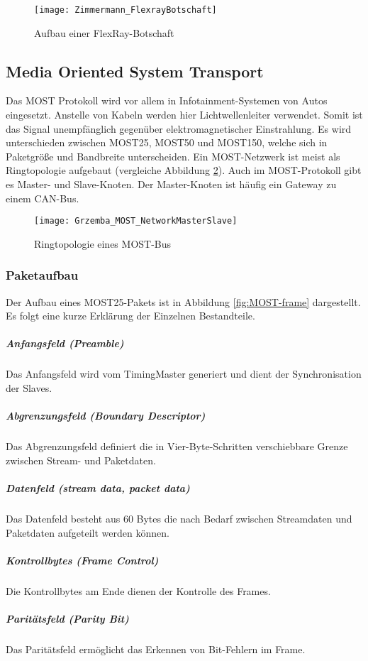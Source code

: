 \begin{figure}[H]
\centering
\texttt{[image: Zimmermann\_FlexrayBotschaft]}
\label{fig:FlexRayBotschaft}
\caption{Aufbau einer FlexRay-Botschaft}
\end{figure}


\subsection{Media Oriented System Transport}
Das \ac{MOST} Protokoll wird vor allem in Infotainment-Systemen von Autos eingesetzt. Anstelle von Kabeln werden hier Lichtwellenleiter verwendet. Somit ist das Signal unempfänglich gegenüber elektromagnetischer Einstrahlung. Es wird unterschieden zwischen \acs{MOST}25, \acs{MOST}50 und \acs{MOST}150, welche sich in Paketgröße und Bandbreite unterscheiden. Ein \acs{MOST}-Netzwerk ist meist als Ringtopologie aufgebaut (vergleiche Abbildung \ref{fig:MOST-NetworkMasterSlave}). Auch im \acs{MOST}-Protokoll gibt es Master- und Slave-Knoten. Der Master-Knoten ist häufig ein Gateway zu einem \acs{CAN}-Bus.\\

\begin{figure}[H]
\centering
\texttt{[image: Grzemba\_MOST\_NetworkMasterSlave]}
\label{fig:MOST-NetworkMasterSlave}
\caption{Ringtopologie eines \acs{MOST}-Bus}
\end{figure}

\subsubsection{Paketaufbau}
Der Aufbau eines \acs{MOST}25-Pakets ist in Abbildung \ref{fig:MOST-frame} dargestellt. Es folgt eine kurze Erklärung der Einzelnen Bestandteile.
\subparagraph{Anfangsfeld (Preamble)} Das Anfangsfeld wird vom TimingMaster generiert und dient der Synchronisation der Slaves.
\subparagraph{Abgrenzungsfeld (Boundary Descriptor)}Das Abgrenzungsfeld definiert die in Vier-Byte-Schritten verschiebbare Grenze zwischen Stream- und Paketdaten.
\subparagraph{Datenfeld (stream data, packet data)}Das Datenfeld besteht aus 60 Bytes die nach Bedarf zwischen Streamdaten und Paketdaten aufgeteilt werden können.
\subparagraph{Kontrollbytes (Frame Control)}Die Kontrollbytes am Ende dienen der Kontrolle des Frames.
\subparagraph{Paritätsfeld (Parity Bit)}Das Paritätsfeld ermöglicht das Erkennen von Bit-Fehlern im Frame.
\\

